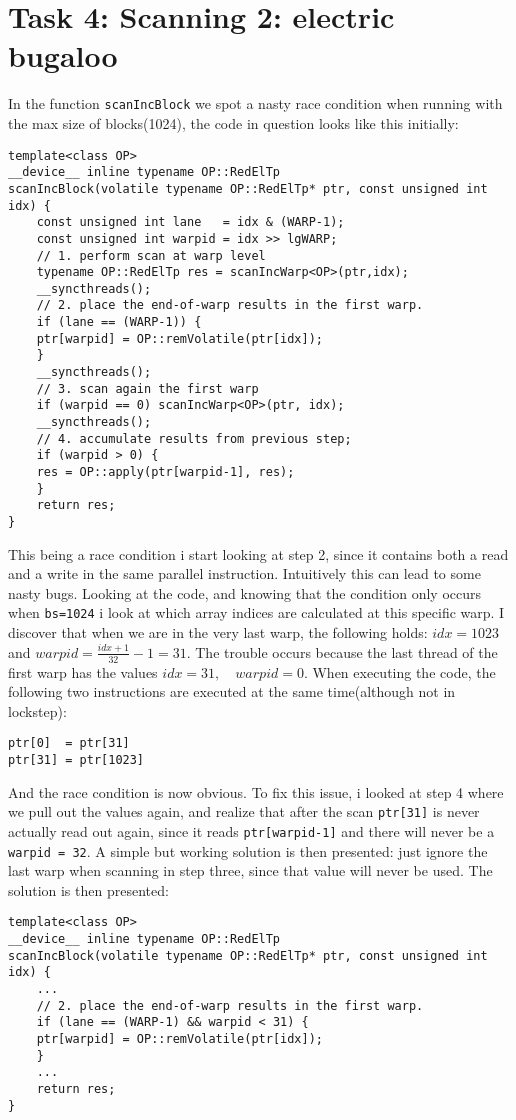 \documentclass[11pt]{article}
\begin{document}
\section{Task 4: Scanning 2: electric bugaloo}
\label{sec:orga9832ea}
In the function \texttt{scanIncBlock} we spot a nasty race condition when running
with the max size of blocks(1024), the code in question looks like this initially:
\begin{verbatim}
template<class OP>
__device__ inline typename OP::RedElTp
scanIncBlock(volatile typename OP::RedElTp* ptr, const unsigned int idx) {
    const unsigned int lane   = idx & (WARP-1);
    const unsigned int warpid = idx >> lgWARP;
    // 1. perform scan at warp level
    typename OP::RedElTp res = scanIncWarp<OP>(ptr,idx);
    __syncthreads();
    // 2. place the end-of-warp results in the first warp.
    if (lane == (WARP-1)) { 
	ptr[warpid] = OP::remVolatile(ptr[idx]);
    }
    __syncthreads();
    // 3. scan again the first warp
    if (warpid == 0) scanIncWarp<OP>(ptr, idx);
    __syncthreads();
    // 4. accumulate results from previous step;
    if (warpid > 0) {
	res = OP::apply(ptr[warpid-1], res);
    }
    return res;
}
\end{verbatim}
This being a race condition i start looking at step 2, since it contains
both a read and a write in the same parallel instruction. Intuitively
this can lead to some nasty bugs.  
Looking at the code, and knowing that the condition only occurs when \texttt{bs=1024}
i look at which array indices are calculated at this specific warp.
I discover that when we are in the very last warp, the following holds:
\(idx = 1023\) and \(warpid = \frac{idx+1}{32}-1 = 31\). The trouble occurs
because the last thread of the first warp has the values \(idx = 31, \quad warpid=0\).  
When executing the code, the following two instructions are executed at the 
same time(although not in lockstep):
\begin{verbatim}
ptr[0]  = ptr[31]
ptr[31] = ptr[1023]
\end{verbatim}
And the race condition is now obvious.  
To fix this issue, i looked at step 4 where we pull out the values again,
and realize that after the scan \texttt{ptr[31]} is never actually read out again,
since it reads \texttt{ptr[warpid-1]} and there will never be a \texttt{warpid = 32}.
A simple but working solution is then presented: just ignore the last warp
when scanning in step three, since that value will never be used. The
solution is then presented:
\begin{verbatim}
template<class OP>
__device__ inline typename OP::RedElTp
scanIncBlock(volatile typename OP::RedElTp* ptr, const unsigned int idx) {
    ...
    // 2. place the end-of-warp results in the first warp.
    if (lane == (WARP-1) && warpid < 31) { 
	ptr[warpid] = OP::remVolatile(ptr[idx]);
    }
    ...
    return res;
}
\end{verbatim}
\end{document}
